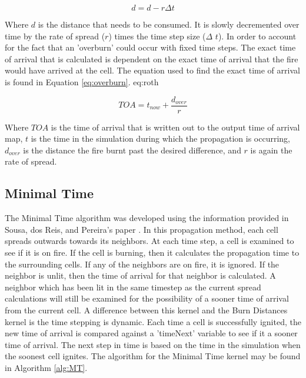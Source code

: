 \begin{equation}
d = d - r \Delta t
\label{eq:burn}
\end{equation}

Where $d$ is the distance that needs to be consumed. It is slowly decremented over time by the rate of spread ($r$) times the time step size ($\Delta$ $t$). In order to account for the fact that an 'overburn' could occur with fixed time steps. The exact time of arrival that is calculated is dependent on the exact time of arrival that the fire would have arrived at the cell. The equation used to find the exact time of arrival is found in Equation \ref{eq:overburn}. eq:roth

\begin{equation}
TOA = t_{now} + \frac{d_{over}}{r}
\label{eq:overburn}
\end{equation}

Where $TOA$ is the time of arrival that is written out to the output time of arrival map, $t$ is the time in the simulation during which the propagation is occurring, $d_{over}$ is the distance the fire burnt past the desired difference, and $r$ is again the rate of spread. 

\subsection{Minimal Time}

The Minimal Time algorithm was developed using the information provided in Sousa, dos Reis, and Pereira's paper \cite{gpufire}. In this propagation method, each cell spreads outwards towards its neighbors. At each time step, a cell is examined to see if it is on fire. If the cell is burning, then it calculates the propagation time to the surrounding cells. If any of the neighbors are on fire, it is ignored. If the neighbor is unlit, then the time of arrival for that neighbor is calculated. A neighbor which has been lit in the same timestep as the current spread calculations will still be examined for the possibility of a sooner time of arrival from the current cell. A difference between this kernel and the Burn Distances kernel is the time stepping is dynamic. Each time a cell is successfully ignited, the new time of arrival is compared against a 'timeNext' variable to see if it a sooner time of arrival. The next step in time is based on the time in the simulation when the soonest cell ignites. The algorithm for the Minimal Time kernel may be found in Algorithm \ref{alg:MT}.

